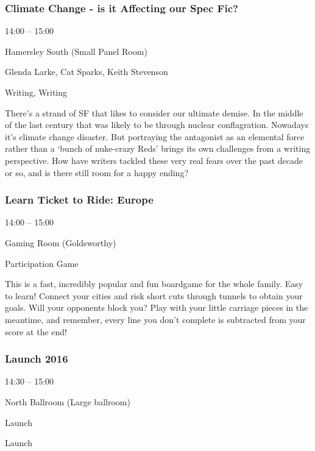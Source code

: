 \documentclass{scrreprt}
\begin{document}
\begin{multicols}{2}
\subsubsection*{Climate Change - is it Affecting our Spec Fic?}\begin{description}
\setlength{\itemsep}{0pt}
\setlength{\parsep}{0pt}
\setlength{\parskip}{0pt}
\item[Time:]{14:00 -- 15:00}
\item[Venue:]{Hamersley South (Small Panel Room)}
\item[People:]{Glenda Larke, Cat Sparks, Keith Stevenson}
\item[Tags:]{Writing, Writing}\end{description}
There’s a strand of SF that likes to consider our ultimate demise. In the middle of the last century that was likely to be through nuclear conflagration. Nowadays it’s climate change disaster. But portraying the antagonist as an elemental force rather than a ‘bunch of nuke-crazy Reds’ brings its own challenges from a writing perspective. How have writers tackled these very real fears over the past decade or so, and is there still room for a happy ending?
\subsubsection*{Learn Ticket to Ride: Europe}\begin{description}
\setlength{\itemsep}{0pt}
\setlength{\parsep}{0pt}
\setlength{\parskip}{0pt}
\item[Time:]{14:00 -- 15:00}
\item[Venue:]{Gaming Room (Goldsworthy)}
\item[Tags:]{Participation Game}\end{description}
This is a fast, incredibly popular and fun boardgame for the whole family. Easy to learn! Connect your cities and risk short cuts through tunnels to obtain your goals. Will your opponents block you? Play with your little carriage pieces in the meantime, and remember, every line you don't complete is subtracted from your score at the end!
\subsubsection*{Launch 2016}\begin{description}
\setlength{\itemsep}{0pt}
\setlength{\parsep}{0pt}
\setlength{\parskip}{0pt}
\item[Time:]{14:30 -- 15:00}
\item[Venue:]{North Ballroom (Large ballroom)}
\item[Tags:]{Launch}\end{description}
Launch

\end{multicols}
\end{document}
